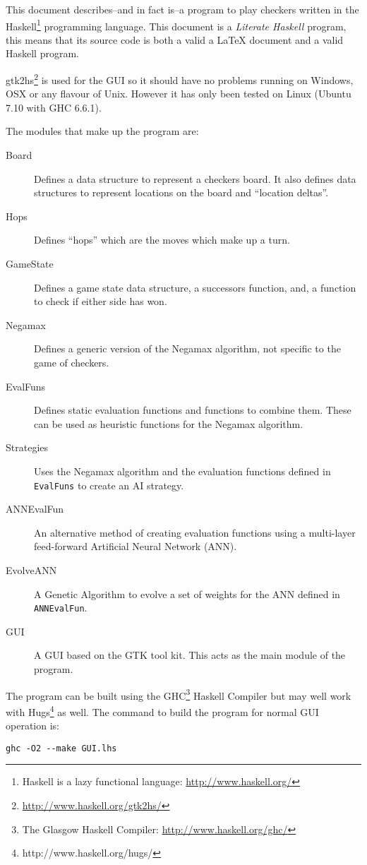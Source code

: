 This document describes--and in fact is--a program to play checkers
written in the Haskell\footnote{Haskell is a lazy functional language:
  \url{http://www.haskell.org/}} programming language.  This document
is a \emph{Literate Haskell} program, this means that its source code
is both a valid a \LaTeX{} document and a valid Haskell program.

gtk2hs\footnote{\url{http://www.haskell.org/gtk2hs/}} is used for the
GUI so it should have no problems running on Windows, OSX or any
flavour of Unix. However it has only been tested on Linux (Ubuntu
7.10 with GHC 6.6.1).

The modules that make up the program are:

\begin{description}
\item[Board]  Defines a data structure to represent
  a checkers board. It also defines data structures to represent
  locations on the board and ``location deltas''.
\item[Hops]  Defines ``hops'' which are the moves
  which make up a turn.
\item[GameState]  Defines a game state data
  structure, a successors function, and, a function to check if either
  side has won.
\item[Negamax]  Defines a generic version of the
  Negamax algorithm, not specific to the game of checkers.
\item[EvalFuns]  Defines static evaluation
  functions and functions to combine them. These can be used as
  heuristic functions for the Negamax algorithm.
\item[Strategies]  Uses the Negamax algorithm
  and the evaluation functions defined in \verb!EvalFuns! to create an
  AI strategy.
\item[ANNEvalFun]  An alternative method of
  creating evaluation functions using a multi-layer feed-forward
  Artificial Neural Network (ANN).
\item[EvolveANN]  A Genetic Algorithm to
  evolve a set of weights for the ANN defined in \verb!ANNEvalFun!.
\item[GUI]  A GUI based on the GTK tool kit. This acts as the main module of the program.
\end{description}

\begin{samepage}
The program can be built using the GHC\footnote{The Glasgow Haskell
  Compiler: \url{http://www.haskell.org/ghc/}} Haskell Compiler but
may well work with Hugs\footnote{http://www.haskell.org/hugs/} as
well. The command to build the program for normal GUI operation is:

\begin{verbatim}
ghc -O2 --make GUI.lhs
\end{verbatim}
\end{samepage}

